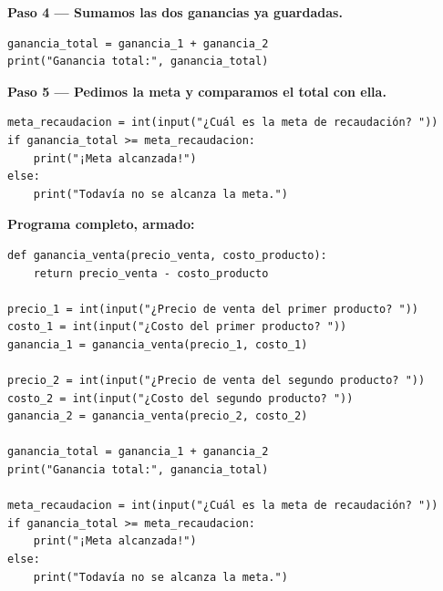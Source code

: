 \documentclass[11pt]{article}
\begin{document}
\begin{estrategiabox}
\vspace{2mm}
\textbf{Paso 4 --- Sumamos las dos ganancias ya guardadas.}

\begin{cajacodigo}
\begin{Verbatim}[fontsize=\small]
ganancia_total = ganancia_1 + ganancia_2
print("Ganancia total:", ganancia_total)
\end{Verbatim}
\end{cajacodigo}

\vspace{2mm}
\textbf{Paso 5 --- Pedimos la meta y comparamos el total con ella.}

\begin{cajacodigo}
\begin{Verbatim}[fontsize=\small]
meta_recaudacion = int(input("¿Cuál es la meta de recaudación? "))
if ganancia_total >= meta_recaudacion:
    print("¡Meta alcanzada!")
else:
    print("Todavía no se alcanza la meta.")
\end{Verbatim}
\end{cajacodigo}

\vspace{2mm}
\textbf{Programa completo, armado:}

\begin{cajacodigo}
\begin{Verbatim}[fontsize=\small]
def ganancia_venta(precio_venta, costo_producto):
    return precio_venta - costo_producto

precio_1 = int(input("¿Precio de venta del primer producto? "))
costo_1 = int(input("¿Costo del primer producto? "))
ganancia_1 = ganancia_venta(precio_1, costo_1)

precio_2 = int(input("¿Precio de venta del segundo producto? "))
costo_2 = int(input("¿Costo del segundo producto? "))
ganancia_2 = ganancia_venta(precio_2, costo_2)

ganancia_total = ganancia_1 + ganancia_2
print("Ganancia total:", ganancia_total)

meta_recaudacion = int(input("¿Cuál es la meta de recaudación? "))
if ganancia_total >= meta_recaudacion:
    print("¡Meta alcanzada!")
else:
    print("Todavía no se alcanza la meta.")
\end{Verbatim}
\end{cajacodigo}


\end{estrategiabox}
\end{document}
